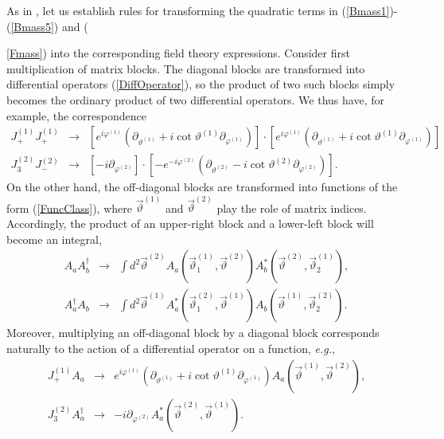 \documentclass[a4paper,12pt]{article}
\begin{document}
As in \cite{AB}, let us establish rules for transforming the quadratic terms in (\ref{Bmass1})-(\ref{Bmass5}) and ({\ref{Fmass}) into the corresponding field theory expressions. Consider first multiplication of matrix blocks. The diagonal blocks are transformed into differential operators (\ref{DiffOperator}), so the product of two such blocks simply becomes the ordinary product of two differential operators. We thus have, for example, the correspondence
\begin{eqnarray}
J^{(1)}_{+}J^{(1)}_{+} &\rightarrow & \left[e^{i\varphi^{(1)}} \left( \partial_{\vartheta^{(1)}} 
               + i \cot \vartheta^{(1)} \partial_{\varphi^{(1)}}\right)\right]\cdot\left[e^{i\varphi^{(1)}} \left( \partial_{\vartheta^{(1)}} 
               + i \cot \vartheta^{(1)} \partial_{\varphi^{(1)}}\right)\right]\nonumber\\
J^{(2)}_{3}J^{(2)}_{-}&\rightarrow & \left[-i\partial_{\varphi^{(2)}}\right]\cdot\left[-e^{-i\varphi^{(2)}} \left( \partial_{\vartheta^{(2)}} 
               - i \cot \vartheta^{(2)} \partial_{\varphi^{(2)}}\right)\right].
\label{TransLaw1}
\end{eqnarray}
On the other hand, the off-diagonal blocks are transformed into functions of the form (\ref{FuncClass}), where $\vec{\vartheta}^{(1)}$ and $\vec{\vartheta}^{(2)}$ play the role of matrix indices. Accordingly, the product of an upper-right block and a lower-left block will become an integral, 
\begin{eqnarray}
A_{a}A_{b}^{\dag} & \rightarrow &\int d^{2}\vec{\vartheta}^{(2)} A_{a}(\vec{\vartheta}^{(1)}_{1},\vec{\vartheta}^{(2)})A^{*}_{b}(\vec{\vartheta}^{(2)},\vec{\vartheta}^{(1)}_{2}),\nonumber\\
A_{a}^{\dag}A_{b} & \rightarrow &\int d^{2}\vec{\vartheta}^{(1)} A^{*}_{a}(\vec{\vartheta}^{(2)}_{1},\vec{\vartheta}^{(1)})A_{b}(\vec{\vartheta}^{(1)},\vec{\vartheta}^{(2)}_{2}).
\label{TransLaw2}
\end{eqnarray}
Moreover, multiplying an off-diagonal block by a diagonal block corresponds naturally to the action of a differential operator on a function, {\it e.g.}, 
\begin{eqnarray}
J^{(1)}_{+}A_{a} &\rightarrow & e^{i\varphi^{(1)}} \left( \partial_{\vartheta^{(1)}} 
               + i \cot \vartheta^{(1)} \partial_{\varphi^{(1)}}\right)A_{a}(\vec{\vartheta}^{(1)},\vec{\vartheta}^{(2)}),\nonumber\\
J^{(2)}_{3}A^{\dag}_{a} &\rightarrow & -i\partial_{\varphi^{(2)}}A^{*}_{a}(\vec{\vartheta}^{(2)},\vec{\vartheta}^{(1)}).
\label{TransLaw3}
\end{eqnarray}

}
\end{document}
